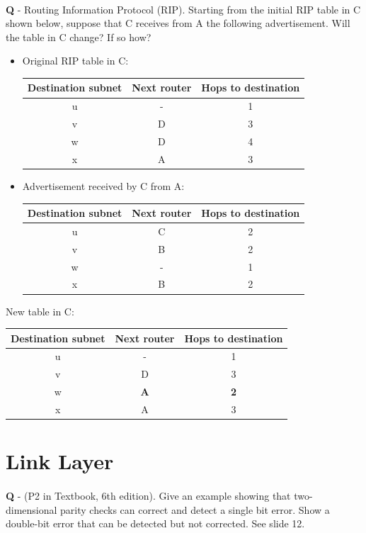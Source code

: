 \documentclass{llncs}
\newcounter{ques}
\newcommand{\quest}[2]{\paragraph{}\textbf{Q\theques} - #1\stepcounter{ques} }
\newcommand{\answer}[1]{
\noindent\color{red}A: #1\color{black}}
\begin{document}
\quest{Routing Information Protocol (RIP). Starting from the initial
  RIP table in C shown below, suppose that C receives from A the following
  advertisement. Will the table in C change? If so how?
  \begin{itemize}
\item  Original RIP table in C:\\
\begin{tabular}{ccc}
  Destination subnet & Next router & Hops to destination \\
  \hline
  u & - & 1\\
  v & D & 3\\
  w & D & 4 \\
  x & A & 3\\
\end{tabular}
\item \vspace*{1cm}Advertisement received by C from A:\\
\begin{tabular}{ccc}
  Destination subnet & Next router  & Hops to destination\\
  \hline
  u & C & 2\\
  v & B & 2\\
  w & - & 1 \\
  x & B & 2\\
\end{tabular}
\end{itemize}
}

\answer{New table in C:\\
  \begin{tabular}{ccc}
    Destination subnet & Next router & Hops to destination \\
    \hline
    u & - & 1\\
    v & D & 3\\
    w & \textbf{A} & \textbf{2} \\
    x & A & 3\\
  \end{tabular}
}


\section{Link Layer}

\quest{(P2 in Textbook, 6th edition). Give an example showing that
  two-dimensional parity checks can correct and detect a single bit
  error. Show a double-bit error that can be detected but not
  corrected.}

\answer{See slide 12.}
\end{document}
